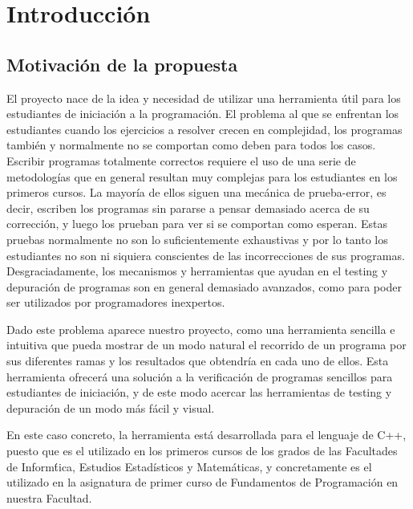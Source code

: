 %
%

\chapter{Introducci\'on}

\section{Motivaci\'on de la propuesta}
\label{cap1:sec:motivacion}

El proyecto nace de la idea y necesidad de utilizar una herramienta \'util para los estudiantes de iniciaci\'on a la programaci\'on. El problema al que se enfrentan los estudiantes cuando los ejercicios a resolver crecen en complejidad, los programas tambi\'en y normalmente no se comportan como deben para todos los casos. Escribir programas totalmente correctos requiere el uso de una serie de metodolog\'ias que en general resultan muy complejas para los estudiantes en los primeros cursos. La mayor\'ia de ellos siguen una mec\'anica de prueba-error, es decir, escriben los programas sin pararse a pensar demasiado acerca de su correcci\'on, y luego los prueban para ver si se comportan como esperan. Estas pruebas normalmente no son lo suficientemente exhaustivas y por lo tanto los estudiantes no son ni siquiera conscientes de las incorrecciones de sus programas. Desgraciadamente, los mecanismos y herramientas que ayudan en el testing y depuraci\'on de programas son en general demasiado avanzados, como para poder ser utilizados por programadores inexpertos.

Dado este problema aparece nuestro proyecto, como una herramienta sencilla e intuitiva que pueda mostrar de un modo natural el recorrido de un programa por sus diferentes ramas y los resultados que obtendr\'ia en cada uno de ellos. Esta herramienta ofrecer\'a una soluci\'on a la verificaci\'on de programas sencillos para estudiantes de iniciaci\'on, y de este modo acercar las herramientas de testing y depuraci\'on de un modo m\'as f\'acil y visual.

En este caso concreto, la herramienta est\'a desarrollada para el lenguaje de C++, puesto que es el utilizado en los primeros cursos de los grados de las Facultades de Inform\'tica, Estudios Estad\'isticos y Matem\'aticas, y concretamente es el utilizado en la asignatura de primer curso de Fundamentos de Programaci\'on en nuestra Facultad.

